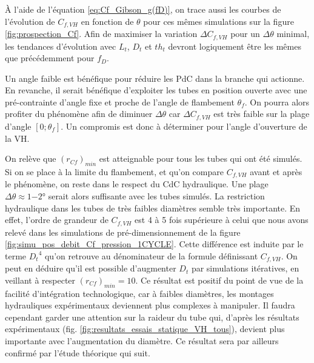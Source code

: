 À l'aide de l'équation \ref{eq:Cf_Gibson_g(fD)}, on trace aussi les courbes de l'évolution de $C_{f,VH}$ en fonction de $\theta$ pour ces mêmes simulations sur la figure \ref{fig:prospection_Cf}. Afin de maximiser la variation $\Delta C_{f,VH}$ pour un $\Delta \theta$ minimal, les tendances d'évolution avec $L_t$, $D_t$ et $th_t$ devront logiquement être les mêmes que précédemment pour $f_D$.

Un angle faible est bénéfique pour réduire les PdC dans la branche qui actionne. En revanche, il serait bénéfique d'exploiter les tubes en position ouverte avec une pré-contrainte d'angle fixe et proche de l'angle de flambement $\theta _f$. On pourra alors profiter du phénomène afin de diminuer $\Delta \theta$ car $\Delta C_{f,VH}$ est très faible sur la plage d'angle $[0;\theta _f]$. Un compromis est donc à déterminer pour l'angle d'ouverture de la VH.

On relève que $(r_{Cf})_{min}$ est atteignable pour tous les tubes qui ont été simulés. Si on se place à la limite du flambement, et qu'on compare $C_{f,VH}$ avant et après le phénomène, on reste dans le respect du CdC hydraulique. Une plage $\Delta \theta \approx \ang{1-2}$ serait alors suffisante avec les tubes simulés. La restriction hydraulique dans les tubes de très faibles diamètres semble très importante. En effet, l'ordre de grandeur de $C_{f,VH}$ est 4 à 5 fois supérieure à celui que nous avons relevé dans les simulations de pré-dimensionnement de la figure \ref{fig:simu_pos_debit_Cf_pression_1CYCLE}. Cette différence est induite par le terme ${D_t}^4$ qu'on retrouve au dénominateur de la formule définissant $C_{f,VH}$. On peut en déduire qu'il est possible d'augmenter $D_t$ par simulations itératives, en veillant à respecter $(r_{Cf})_{min}=10$. Ce résultat est positif du point de vue de la facilité d'intégration technologique, car à faibles diamètres, les montages hydrauliques expérimentaux deviennent plus complexes à manipuler. Il faudra cependant garder une attention sur la raideur du tube qui, d'après les résultats expérimentaux (fig. \ref{fig:resultats_essais_statique_VH_tous}), devient plus importante avec l'augmentation du diamètre. Ce résultat sera par ailleurs confirmé par l'étude théorique qui suit.
